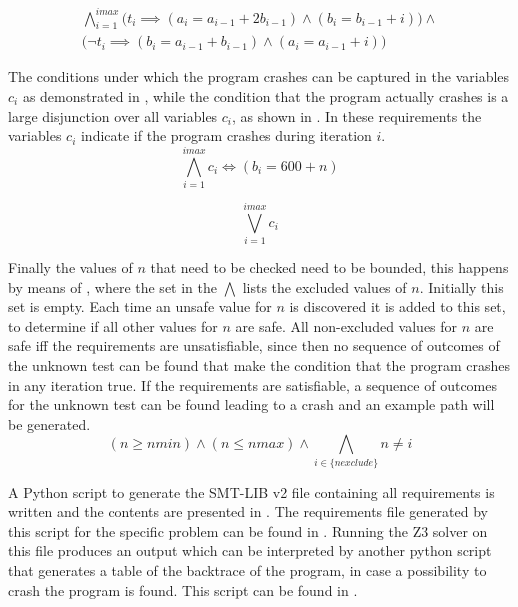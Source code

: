 \begin{equation}
  \label{eqn:4_loop}
  \begin{aligned}
    \bigwedge_{i = 1}^{imax}
      \Big(t_{i} \implies (a_{i} = a_{i - 1} + 2b_{i - 1}) \wedge (b_{i} = b_{i - 1} + i)\Big) \wedge \\
      \Big(\neg t_{i} \implies (b_{i} = a_{i - 1} + b_{i - 1}) \wedge (a_{i} = a_{i - 1} + i)\Big)
    \end{aligned}
\end{equation}

The conditions under which the program crashes can be captured in the variables $c_{i}$ as demonstrated in , while the condition that the program actually crashes is a large disjunction over all variables $c_{i}$, as shown in . In these requirements the variables $c_{i}$ indicate if the program crashes during iteration $i$.
\begin{equation}
  \label{eqn:4_condcrash}
  \bigwedge_{i = 1}^{imax}
    c_{i} \iff (b_{i} = 600 + n)
\end{equation}

\begin{equation}
  \label{eqn:4_docrash}
  \bigvee_{i = 1}^{imax} c_{i}
\end{equation}

Finally the values of $n$ that need to be checked need to be bounded, this happens by means of , where the set in the $\bigwedge$ lists the excluded values of $n$. Initially this set is empty. Each time an unsafe value for $n$ is discovered it is added to this set, to determine if all other values for $n$ are safe. All non-excluded values for $n$ are safe iff the requirements are unsatisfiable, since then no sequence of outcomes of the unknown test can be found that make the condition that the program crashes in any iteration true. If the requirements are satisfiable, a sequence of outcomes for the unknown test can be found leading to a crash and an example path will be generated.
\begin{equation}
  \label{eqn:4_valn}
  (n \geq nmin) \wedge (n \leq nmax) \wedge
  \bigwedge_{i \in \{nexclude\}} n \neq i
\end{equation}

A Python script to generate the SMT-LIB v2 file containing all requirements is written and the contents are presented in . The requirements file generated by this script for the specific problem can be found in . Running the Z3 solver on this file produces an output which can be interpreted by another python script that generates a table of the backtrace of the program, in case a possibility to crash the program is found. This script can be found in .

